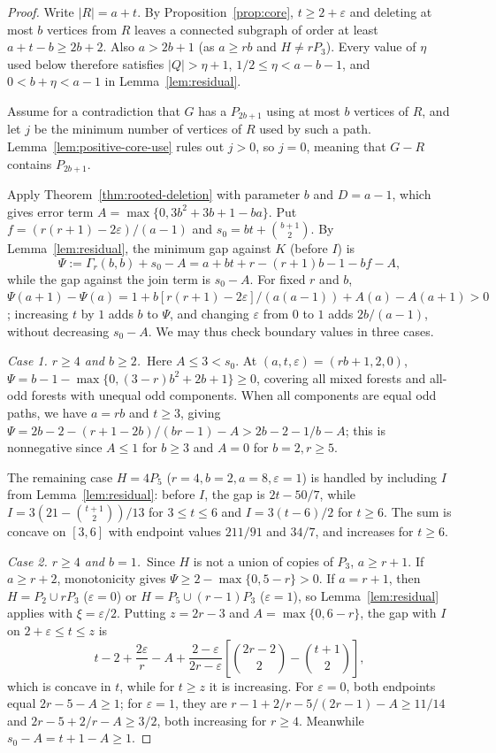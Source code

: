 \documentclass[10pt]{article}
\theoremstyle{compactplain}
\theoremstyle{remark}\newtheorem{remark}[theorem]{Remark}
\begin{document}
\begin{proof}
Write $|R|=a+t$. By Proposition~\ref{prop:core}, $t\ge2+\varepsilon$
and deleting at most $b$ vertices from $R$ leaves a connected subgraph
of order at least $a+t-b\ge2b+2$. Also $a>2b+1$ (as $a\ge rb$ and
$H\ne rP_3$). Every value of $\eta$ used below therefore satisfies
$|Q|>\eta+1$, $1/2\le\eta<a-b-1$, and $0<b+\eta<a-1$ in
Lemma~\ref{lem:residual}.

Assume for a contradiction that $G$ has a $P_{2b+1}$ using at most $b$
vertices of $R$, and let $j$ be the minimum number of vertices of $R$
used by such a path. Lemma~\ref{lem:positive-core-use} rules out $j>0$,
so $j=0$, meaning that $G-R$ contains $P_{2b+1}$.

Apply Theorem~\ref{thm:rooted-deletion} with parameter $b$ and $D=a-1$,
which gives error term $A=\max\{0,3b^2+3b+1-ba\}$. Put
$f=(r(r+1)-2\varepsilon)/(a-1)$ and $s_0=bt+\binom{b+1}{2}$. By
Lemma~\ref{lem:residual}, the minimum gap against $K$ (before $I$) is
\[
 \Psi:=\Gamma_r(b,b)+s_0-A=a+bt+r-(r+1)b-1-bf-A,
\]
while the gap against the join term is $s_0-A$. For fixed $r$ and $b$,
$\Psi(a+1)-\Psi(a)=1+b[r(r+1)-2\varepsilon]/(a(a-1))+A(a)-A(a+1)>0$;
increasing $t$ by $1$ adds $b$ to $\Psi$, and changing $\varepsilon$
from $0$ to $1$ adds $2b/(a-1)$, without decreasing $s_0-A$. We may
thus check boundary values in three cases.

\medskip\noindent\emph{Case 1. $r\ge4$ and $b\ge2$.}\ 
Here $A\le3<s_0$. At $(a,t,\varepsilon)=(rb+1,2,0)$,
$\Psi=b-1-\max\{0,(3-r)b^2+2b+1\}\ge0$, covering all mixed forests and
all-odd forests with unequal odd components. When all components are
equal odd paths, we have $a=rb$ and $t\ge3$, giving
$\Psi=2b-2-(r+1-2b)/(br-1)-A>2b-2-1/b-A$; this is nonnegative since
$A\le1$ for $b\ge3$ and $A=0$ for $b=2,r\ge5$.

The remaining case $H=4P_5$ ($r=4,b=2,a=8,\varepsilon=1$) is handled by
including $I$ from Lemma~\ref{lem:residual}: before $I$, the gap is
$2t-50/7$, while $I=3(21-\binom{t+1}{2})/13$ for $3\le t\le6$ and
$I=3(t-6)/2$ for $t\ge6$. The sum is concave on $[3,6]$ with endpoint
values $211/91$ and $34/7$, and increases for $t\ge6$.

\medskip\noindent\emph{Case 2. $r\ge4$ and $b=1$.}\ 
Since $H$ is not a union of copies of $P_3$, $a\ge r+1$. If $a\ge r+2$,
monotonicity gives $\Psi\ge2-\max\{0,5-r\}>0$. If $a=r+1$, then
$H=P_2\cup rP_3$ ($\varepsilon=0$) or $H=P_5\cup(r-1)P_3$
($\varepsilon=1$), so Lemma~\ref{lem:residual} applies with
$\xi=\varepsilon/2$. Putting $z=2r-3$ and $A=\max\{0,6-r\}$, the gap
with $I$ on $2+\varepsilon\le t\le z$ is
\[
 t-2+\frac{2\varepsilon}{r}-A
 +\frac{2-\varepsilon}{2r-\varepsilon}
 \left[\binom{2r-2}{2}-\binom{t+1}{2}\right],
\]
which is concave in $t$, while for $t\ge z$ it is increasing. For
$\varepsilon=0$, both endpoints equal $2r-5-A\ge1$; for $\varepsilon=1$,
they are $r-1+2/r-5/(2r-1)-A\ge11/14$ and $2r-5+2/r-A\ge3/2$, both
increasing for $r\ge4$. Meanwhile $s_0-A=t+1-A\ge1$.


\end{proof}
\end{document}
